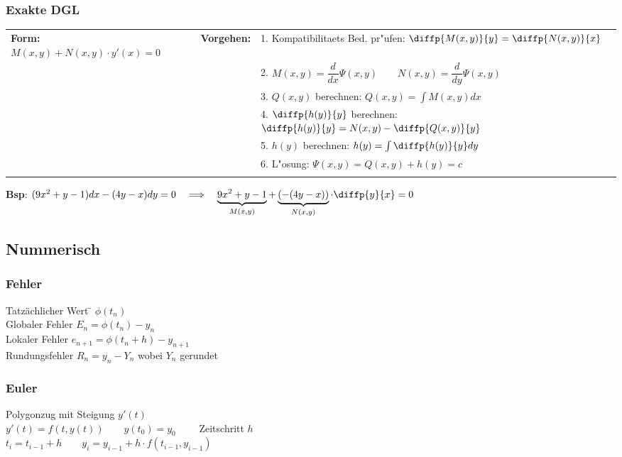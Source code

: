 \subsubsection{Exakte DGL}
\begin{tabular}{p{6cm}p{2cm}p{10.5cm}}
\textbf{Form:} $M(x,y) + N(x,y)\cdot y'(x) = 0$ &
\textbf{Vorgehen:}              &

1. Kompatibilitaets Bed. pr"ufen: $\diffp{M(x,y)}{y} = \diffp{N(x,y)}{x}$ \\ &&
2. $ M(x,y) = \dfrac{d}{dx}\Psi(x,y) \qquad N(x,y) = \dfrac{d}{dy}\Psi(x,y) $ \\ &&
3. $Q(x,y)$ berechnen: $Q(x,y) = \int M(x,y) dx$ \\ &&
4. $\diffp{h(y)}{y}$ berechnen: $\diffp{h(y)}{y} = N(x,y) - \diffp{Q(x,y)}{y}$ \\ &&
5. $h(y)$ berechnen: $h(y) = \int \diffp{h(y)}{y} dy $ \\ &&
6. L"osung: $\Psi(x,y) = Q(x,y) + h(y) = c $ \\ &&
\end{tabular}
\textbf{Bsp}: $(9x^2 + y -1)dx - (4y -x)dy = 0 \quad \Longrightarrow \quad  \underbrace{9x^2 +y -1}_{M(x,y)} + \underbrace{(-(4y -x))}_{N(x,y)} \cdot \diffp{y}{x} = 0$

\subsection{Nummerisch}
\subsubsection{Fehler}

\begin{tabbing}
Tatzächlicher Wert  \= $\phi(t_n)$ \\
Globaler Fehler \> $E_n = \phi(t_n) - y_n$ \\
Lokaler Fehler \> $e_{n+1} = \phi(t_n + h) - y_{n+1}$ \\
Rundungsfehler \> $R_n = y_n - Y_n$ wobei $Y_n$ gerundet
\end{tabbing}

\subsubsection{Euler}
Polygonzug mit Steigung $y'(t)$\\
$y'(t)=f(t,y(t)) \qquad y(t_0)=y_0 \qquad$ Zeitschritt $h$\\
$t_i = t_{i-1} + h \qquad y_i=y_{i-1} + h \cdot f(t_{i-1},y_{i-1})$\\


